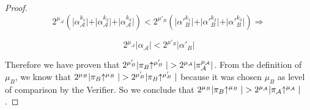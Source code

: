 \begin{proof}
\begin{equation*}
	2^{\mu_\mathcal{A}} ( \vert \alpha_\mathcal{A}^{k_1} \vert + \vert \alpha_\mathcal{A}^{k_2} \vert + \vert \alpha_\mathcal{A}^{k_3} \vert ) < 2^{\mu'_B} ( \vert \alpha'{_B^{k_1}} \vert + \vert \alpha'{_B^{k_2}} \vert + \vert \alpha'{_B^{k_3}} \vert) \Rightarrow
\end{equation*}

\begin{equation} \label{eq_v_all_round_sets}
	2^{\mu_\mathcal{A}} \vert \alpha_\mathcal{A} \vert < 2^{\mu'_B} \vert \alpha'{_B} \vert
\end{equation}

Therefore we have proven that $2^{\mu'_B} \vert \pi_B \negthickspace\uparrow^{\mu'_B} \vert > 2^{\mu_\mathcal{A}} \vert \pi_\mathcal{A}^{\mu_\mathcal{A}} \vert$. From the definition of $\mu_B$, we know that $2^{\mu_B} \vert \pi_B \negthickspace\uparrow^{\mu_B} \vert > 2^{\mu'_B} \vert \pi_B \negthickspace\uparrow^{\mu'_B} \vert$ because it was chosen $\mu_B$ as level of comparison by the Verifier. So we conclude that $2^{\mu_B} \vert \pi_B \negthickspace\uparrow^{\mu_B} \vert > 2^{\mu_\mathcal{A}} \vert \pi_\mathcal{A} \negthickspace\uparrow^{\mu_\mathcal{A}} \vert$.
\end{proof}
